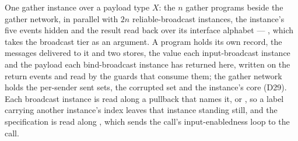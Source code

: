 \begin{definition}
  \label{def:aba-gather-sub}
  \leanok
  One gather instance over a payload type $X$: the $n$ gather programs beside the gather network, in parallel with $2n$ reliable-broadcast instances, the instance's five events hidden and the result read back over its interface alphabet --- , which takes the broadcast tier as an argument.
  A program holds its own record, the messages delivered to it and two stores, the value each input-broadcast instance and the payload each bind-broadcast instance has returned here, written on the return events and read by the guards that consume them; the gather network holds the per-sender sent sets, the corrupted set and the instance's core (D29).
  Each broadcast instance is read along a pullback that names it,  or , so a label carrying another instance's index leaves that instance standing still, and the specification is read along , which sends the call's input-enabledness loop to the call.
\end{definition}
